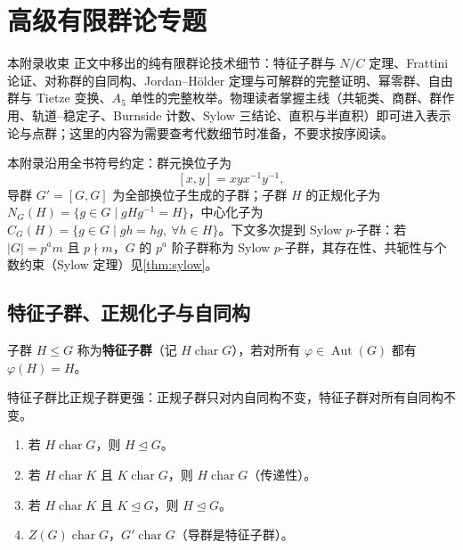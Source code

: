 \chapter{高级有限群论专题}
\label{app:advanced-finite-group}

本附录收束 正文中移出的纯有限群论技术细节：特征子群与 $N/C$ 定理、Frattini 论证、对称群的自同构、Jordan--H\"older 定理与可解群的完整证明、幂零群、自由群与 Tietze 变换、$A_5$ 单性的完整枚举。物理读者掌握主线（共轭类、商群、群作用、轨道--稳定子、Burnside 计数、Sylow 三结论、直积与半直积）即可进入表示论与点群；这里的内容为需要查考代数细节时准备，不要求按序阅读。

本附录沿用全书符号约定：群元换位子为
\[
[x,y]=xyx^{-1}y^{-1},
\]
导群 $G'=[G,G]$ 为全部换位子生成的子群；子群 $H$ 的正规化子为 $N_G(H)=\{g\in G\mid gHg^{-1}=H\}$，中心化子为 $C_G(H)=\{g\in G\mid gh=hg,\ \forall h\in H\}$。下文多次提到 Sylow $p$-子群：若 $|G|=p^am$ 且 $p\nmid m$，$G$ 的 $p^a$ 阶子群称为 Sylow $p$-子群，其存在性、共轭性与个数约束（Sylow 定理）见\cref{thm:sylow}。

\section{特征子群、正规化子与自同构}
\label{sec:char-normalizer}

\begin{definition}[特征子群]
子群 $H\leqslant G$ 称为\textbf{特征子群}（记 $H\operatorname{char}G$），若对所有 $\varphi\in\operatorname{Aut}(G)$ 都有 $\varphi(H)=H$。
\end{definition}

特征子群比正规子群更强：正规子群只对内自同构不变，特征子群对所有自同构不变。

\begin{proposition}[特征子群的性质]
\label{prop:characteristic-subgroup}
\begin{enumerate}
\item 若 $H\operatorname{char}G$，则 $H\mathrel{\trianglelefteq} G$。
\item 若 $H\operatorname{char}K$ 且 $K\operatorname{char}G$，则 $H\operatorname{char}G$（传递性）。
\item 若 $H\operatorname{char}K$ 且 $K\mathrel{\trianglelefteq} G$，则 $H\mathrel{\trianglelefteq} G$。
\item $Z(G)\operatorname{char}G$，$G'\operatorname{char}G$（导群是特征子群）。
\end{enumerate}
\end{proposition}

